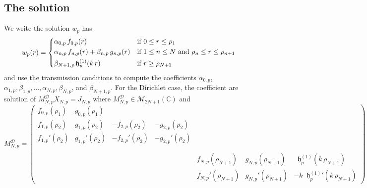 \documentclass[12pt,a4paper]{article}
\theoremstyle{definition}
\theoremstyle{plain}
\theoremstyle{remark}
\newcommand{\bbC}{\mathbb{C}}
\newcommand{\calD}{\mathcal{D}}
\newcommand{\calM}{\mathcal{M}}
\newcommand{\frh}{\mathop{}\!\mathfrak{h}^{(1)}}
\begin{document}
\subsection{The solution}

We write the solution $w_p$ has
\begin{equation}
    w_p(r) = \begin{dcases}
        \alpha_{0, p}\, f_{0, p}(r)                              & \text{if } 0 \le r \le \rho_1                                     \\
        \alpha_{n, p}\, f_{n, p}(r) + \beta_{n, p}\, g_{n, p}(r) & \text{if } 1 \le n \le N \text{ and } \rho_n \le r \le \rho_{n+1} \\
        \beta_{N+1, p}\frh_p(k\, r)                              & \text{if } r \ge \rho_{N+1}
    \end{dcases}
\end{equation}
and use the transmission conditions to compute the coefficients $\alpha_{0, p}$, $\alpha_{1, p}, \beta_{1, p}, \ldots, \alpha_{N, p}, \beta_{N, p}$, and $\beta_{N+1, p}$.
For the Dirichlet case, the coefficient are solution of $M_{N, p}^\calD X_{N, p} = J_{N, p}$ where $M_{N, p}^\calD \in \calM_{2N+1}(\bbC)$ and
\[
    M_{N, p}^\calD = \begin{pmatrix}
        f_{0, p}(\rho_1)  & g_{0, p}(\rho_1)                                                                                                                          \\
        f_{1, p}(\rho_2)  & g_{1, p}(\rho_2)  & -f_{2, p}(\rho_2)  & -g_{2, p}(\rho_2)                                                                                \\
        f_{1, p}'(\rho_2) & g_{1, p}'(\rho_2) & -f_{2, p}'(\rho_2) & -g_{2, p}'(\rho_2)                                                                               \\
        \\
        \\
                          &                   &                    &                    & f_{N, p}(\rho_{N+1})  & g_{N, p}(\rho_{N+1})  & \frh_p(k\, \rho_{N+1})      \\
                          &                   &                    &                    & f_{N, p}'(\rho_{N+1}) & g_{N, p}'(\rho_{N+1}) & -k{\frh_p}'(k\, \rho_{N+1})
    \end{pmatrix}
\]
\end{document}
